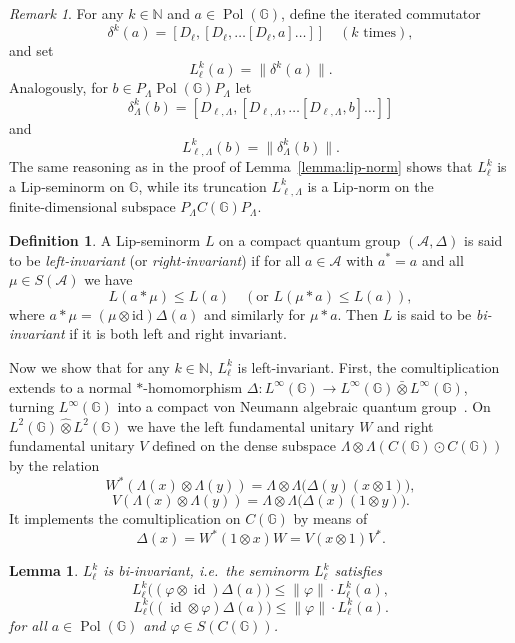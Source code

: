 \documentclass[12pt, reqno]{amsart}
\newtheorem{lemma}[theorem]{Lemma}
\theoremstyle{definition}
\newtheorem{definition}[theorem]{Definition}
\theoremstyle{remark}
\newtheorem{remark}[theorem]{Remark}
\numberwithin{equation}{section}
\begin{document}
\begin{remark}
    For any $k \in \mathbb{N}$ and $a \in \operatorname{Pol}(\mathbb{G})$, 
    define the iterated commutator
    \[
    \delta^k(a) = [D_\ell, [D_\ell, \dots [D_\ell, a]\dots]] \quad 
    (k\text{ times}),
    \]
    and set
    \[
    L_\ell^k(a) = \|\delta^k(a)\|.
    \]
    Analogously, for $b \in P_\Lambda \operatorname{Pol}(\mathbb{G}) P_\Lambda$ let
    \[
    \delta_\Lambda^k(b) = [D_{\ell,\Lambda}, [D_{\ell,\Lambda}, \dots 
                         [D_{\ell,\Lambda}, b]\dots]]
    \]
    and
    \[
    L_{\ell,\Lambda}^k(b) = \|\delta_\Lambda^k(b)\|.
    \]
    The same reasoning as in the proof of Lemma~\ref{lemma:lip-norm} shows 
    that $L_\ell^k$ is a Lip‑seminorm on $\mathbb{G}$, while its truncation 
    $L_{\ell,\Lambda}^k$ is a Lip‑norm on the finite‑dimensional subspace 
    $P_\Lambda C(\mathbb{G}) P_\Lambda$.
\end{remark}

\begin{definition}
    A Lip-seminorm $L$ on a compact quantum group $(\mathcal{A}, \Delta)$ is 
    said to be \emph{left-invariant} (or \emph{right-invariant}) if for all 
    $a \in \mathcal{A}$ with $a^* = a$ and all $\mu \in S(\mathcal{A})$ we have
    \[
    L(a * \mu) \leq L(a) \quad (\text{or } L(\mu * a) \leq L(a)),
    \]
    where $a * \mu = (\mu \otimes \mathrm{id}) \Delta(a)$ and similarly for 
    $\mu * a$. Then $L$ is said to be \emph{bi-invariant} if it is both left 
    and right invariant.
\end{definition}

Now we show that for any $k\in \mathbb{N}$, $L_\ell^k$ is left-invariant. 
First, the comultiplication extends to a normal $*$-homomorphism 
$\Delta \colon L^{\infty}(\mathbb{G}) \to 
L^{\infty}(\mathbb{G}) \bar{\otimes} L^{\infty}(\mathbb{G})$, turning 
$L^{\infty}(\mathbb{G})$ into a compact von Neumann algebraic quantum 
group~\cite{22}. On $L^2(\mathbb{G}) \hat{\otimes} L^2(\mathbb{G})$ we have the 
left fundamental unitary $W$ and right fundamental unitary $V$ defined on the dense subspace 
$\Lambda \otimes \Lambda (C(\mathbb{G}) \odot C(\mathbb{G}))$ by the relation
\[
W^*(\Lambda(x) \otimes \Lambda(y)) = \Lambda \otimes \Lambda\bigl(\Delta(y)(x \otimes 1)\bigr),
\]
\[V(\Lambda(x) \otimes \Lambda(y)) = \Lambda \otimes \Lambda\bigl(\Delta(x)(1\otimes y)\bigr).\]
It implements the comultiplication on $C(\mathbb{G})$ by means of
\[
\Delta(x) = W^*(1 \otimes x)W=V(x\otimes1)V^*. \tag{2.3}
\]

\begin{lemma}\label{lemma left}
\(L_\ell^k\) is bi-invariant, i.e.\ the seminorm \(L_\ell^k\) satisfies
\[
L_\ell^k\bigl((\varphi \otimes \operatorname{id})\Delta(a)\bigr) 
\le \|\varphi\| \cdot L_\ell^k(a),
\]
\[L_\ell^k\bigl(( \operatorname{id}\otimes\varphi)\Delta(a)\bigr) 
\le \|\varphi\| \cdot L_\ell^k(a).
\]
for all \(a \in \operatorname{Pol}(\mathbb{G})\) and 
\(\varphi \in S(C(\mathbb{G}))\).
\end{lemma}
\end{document}
